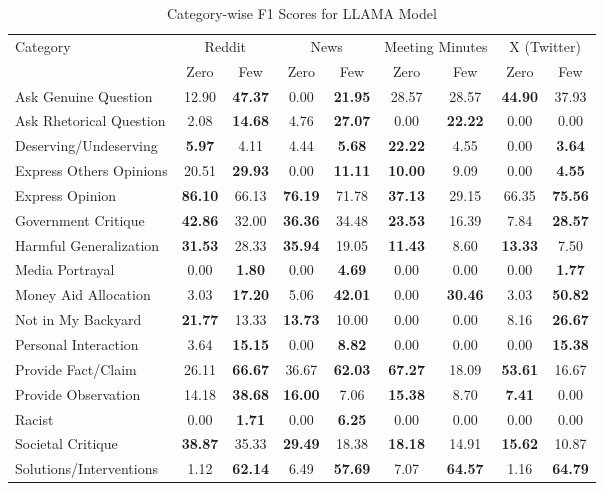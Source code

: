 \begin{table*}[htbp]
\centering
\begin{tabular}{l *{8}{c}}
\toprule
Category & \multicolumn{2}{c}{Reddit} & \multicolumn{2}{c}{News} & \multicolumn{2}{c}{Meeting Minutes} & \multicolumn{2}{c}{X (Twitter)} \\
& Zero & Few & Zero & Few & Zero & Few & Zero & Few \\
\midrule
Ask Genuine Question & 12.90 & \textbf{47.37} & 0.00 & \textbf{21.95} & 28.57 & 28.57 & \textbf{44.90} & 37.93 \\
Ask Rhetorical Question & 2.08 & \textbf{14.68} & 4.76 & \textbf{27.07} & 0.00 & \textbf{22.22} & 0.00 & 0.00 \\
Deserving/Undeserving & \textbf{5.97} & 4.11 & 4.44 & \textbf{5.68} & \textbf{22.22} & 4.55 & 0.00 & \textbf{3.64} \\
Express Others Opinions & 20.51 & \textbf{29.93} & 0.00 & \textbf{11.11} & \textbf{10.00} & 9.09 & 0.00 & \textbf{4.55} \\
Express Opinion & \textbf{86.10} & 66.13 & \textbf{76.19} & 71.78 & \textbf{37.13} & 29.15 & 66.35 & \textbf{75.56} \\
Government Critique & \textbf{42.86} & 32.00 & \textbf{36.36} & 34.48 & \textbf{23.53} & 16.39 & 7.84 & \textbf{28.57} \\
Harmful Generalization & \textbf{31.53} & 28.33 & \textbf{35.94} & 19.05 & \textbf{11.43} & 8.60 & \textbf{13.33} & 7.50 \\
Media Portrayal & 0.00 & \textbf{1.80} & 0.00 & \textbf{4.69} & 0.00 & 0.00 & 0.00 & \textbf{1.77} \\
Money Aid Allocation & 3.03 & \textbf{17.20} & 5.06 & \textbf{42.01} & 0.00 & \textbf{30.46} & 3.03 & \textbf{50.82} \\
Not in My Backyard & \textbf{21.77} & 13.33 & \textbf{13.73} & 10.00 & 0.00 & 0.00 & 8.16 & \textbf{26.67} \\
Personal Interaction & 3.64 & \textbf{15.15} & 0.00 & \textbf{8.82} & 0.00 & 0.00 & 0.00 & \textbf{15.38} \\
Provide Fact/Claim & 26.11 & \textbf{66.67} & 36.67 & \textbf{62.03} & \textbf{67.27} & 18.09 & \textbf{53.61} & 16.67 \\
Provide Observation & 14.18 & \textbf{38.68} & \textbf{16.00} & 7.06 & \textbf{15.38} & 8.70 & \textbf{7.41} & 0.00 \\
Racist & 0.00 & \textbf{1.71} & 0.00 & \textbf{6.25} & 0.00 & 0.00 & 0.00 & 0.00 \\
Societal Critique & \textbf{38.87} & 35.33 & \textbf{29.49} & 18.38 & \textbf{18.18} & 14.91 & \textbf{15.62} & 10.87 \\
Solutions/Interventions & 1.12 & \textbf{62.14} & 6.49 & \textbf{57.69} & 7.07 & \textbf{64.57} & 1.16 & \textbf{64.79} \\
\bottomrule
\end{tabular}
\caption{Category-wise F1 Scores for LLAMA Model}
\label{tab:llama_category_breakdown}
\end{table*}